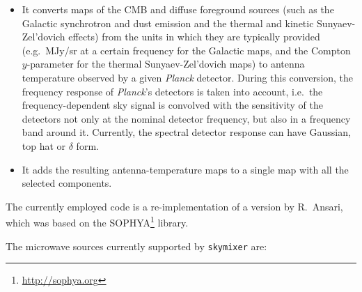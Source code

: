 \documentclass{aa}
\begin{document}
\begin{itemize}

  \item It converts maps of the CMB and diffuse foreground sources
    (such as the Galactic synchrotron and dust emission and the
    thermal and kinetic Sunyaev-Zel'dovich effects) from the units in
    which they are typically provided (e.g.\ MJy/sr at a certain
    frequency for the Galactic maps, and the Compton
    $y$-parameter for the thermal Sunyaev-Zel'dovich maps) to antenna
    temperature observed by a given \emph{Planck} detector.  During
    this conversion, the frequency response of \emph{Planck}'s
    detectors is taken into account, i.e.\ the frequency-dependent sky
    signal is convolved with the sensitivity of the detectors not only
    at the nominal detector frequency, but also in a frequency band around
    it. Currently, the spectral detector response can have Gaussian,
    top hat or $\delta$ form.

  \item It adds the resulting antenna-temperature maps to a single map
    with all the selected components.

\end{itemize}

The currently employed code is a re-implementation of a version by
R.~Ansari, which was based on the SOPHYA\footnote{\href{http://sophya.org}{http://sophya.org}} library.

The microwave sources currently supported by {\tt skymixer} are:
\end{document}
